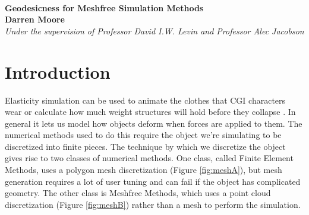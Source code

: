 \documentclass[11pt,a4paper, final, twoside]{article}
\theoremstyle{proposition}
\theoremstyle{definition}
\theoremstyle{remark}
\numberwithin{equation}{section}
\begin{document}

\begin{center}

{\Large \textbf{\\Geodesicness for Meshfree Simulation Methods }}\\[5mm]
{\large \textbf{Darren Moore}\\[1mm]}
{\normalsize \emph{Under the supervision of Professor David I.W. Levin and Professor Alec Jacobson}\\[1mm]}
\end{center}

\section{Introduction}
Elasticity simulation can be used to animate the clothes that CGI characters wear or calculate how much weight structures will hold before they collapse \cite{Irving:2004:IFE:1028523.1028541} \cite{Clough:1990:OFF:106419.106421}. In general it lets us model how objects deform when forces are applied to them. The numerical methods used to do this require the object we're simulating to be discretized into finite pieces. The technique by which we discretize the object gives rise to two classes of numerical methods. One class, called Finite Element Methods, uses a polygon mesh discretization (Figure \ref{fig:meshA}), but mesh generation requires a lot of user tuning and can fail if the object has complicated geometry. The other class is Meshfree Methods, which uses a point cloud discretization (Figure \ref{fig:meshB}) rather than a mesh to perform the simulation.
\end{document}

